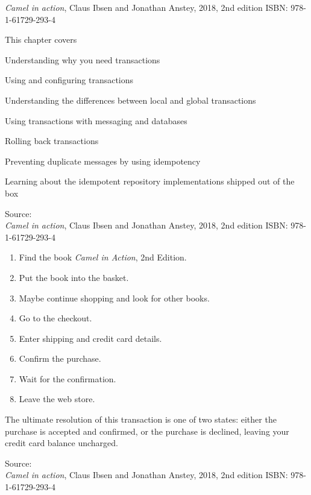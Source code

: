 \documentclass[Screen16to9,17pt]{foils}
\begin{document}
\emph{Camel in action}, Claus Ibsen and Jonathan Anstey, 2018, 2nd edition
ISBN: 978-1-61729-293-4



This chapter covers
\begin{list2}
\item Understanding why you need transactions
\item Using and configuring transactions
\item Understanding the differences between
local and global transactions
\item Using transactions with messaging and databases
\item Rolling back transactions
\item Preventing duplicate messages by using idempotency
\item Learning about the idempotent repository
implementations shipped out of the box
\end{list2}

Source: {\footnotesize\\
\emph{Camel in action}, Claus Ibsen and Jonathan Anstey, 2018, 2nd edition
ISBN: 978-1-61729-293-4}


\begin{enumerate}
\item Find the book \emph{Camel in Action}, 2nd Edition.
\item Put the book into the basket.
\item Maybe continue shopping and look for other books.
\item Go to the checkout.
\item Enter shipping and credit card details.
\item Confirm the purchase.
\item Wait for the confirmation.
\item Leave the web store.
\end{enumerate}

The ultimate resolution of this transaction is one of two states: either the purchase is accepted and confirmed, or the purchase is declined, leaving your credit card balance uncharged.

Source: {\footnotesize\\
\emph{Camel in action}, Claus Ibsen and Jonathan Anstey, 2018, 2nd edition
ISBN: 978-1-61729-293-4}
\end{document}
